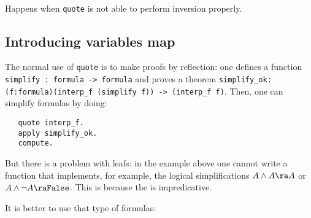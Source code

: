 \begin{ErrMsgs}
\item {} \\
  Happens when \texttt{quote} is not able to perform inversion properly.
\end{ErrMsgs}

\subsection{Introducing variables map}

The normal use of \texttt{quote} is to make proofs by reflection: one
defines a function \texttt{simplify : formula -> formula} and proves a 
theorem \texttt{simplify\_ok: (f:formula)(interp\_f (simplify f)) ->
  (interp\_f f)}. Then, one can simplify formulas by doing:
\begin{verbatim}
   quote interp_f.
   apply simplify_ok.
   compute.
\end{verbatim}
But there is a problem with leafs: in the example above one cannot
write a function that implements, for example, the logical simplifications 
$A \land A \ra A$ or $A \land \lnot A \ra \texttt{False}$. This is
because the \Prop{} is impredicative.

It is better to use that type of formulas:

